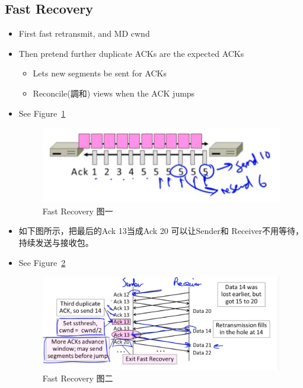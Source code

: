 \documentclass[12pt]{ctexart}   %
\begin{document}
	\subsection{Fast Recovery}
	\begin{itemize}
		\item First fast retransmit, and MD cwnd
		\item Then pretend further duplicate ACKs are the expected ACKs
		\begin{itemize}
			\item Lets new segments be sent for ACKs
			\item Reconcile(調和) views when the ACK jumps
		\end{itemize}
		\item See Figure~\ref{fig:7-7-4}
		  
		 \begin{figure}[h!] %
		\centering
		 \includegraphics[scale=0.7]{images/7-7-4}
		\caption{ Fast Recovery 图一 }
		 \label{fig:7-7-4}
		 \end{figure}
		 
		 \item 如下图所示，把最后的Ack 13当成Ack 20 可以让Sender和 Receiver不用等待，持续发送与接收包。
		 \item See Figure~\ref{fig:7-7-5}
		  
		 \begin{figure}[h!] %
		\centering
		 \includegraphics[scale=0.7]{images/7-7-5}
		\caption{ Fast Recovery 图二 }
		 \label{fig:7-7-5}
		 \end{figure}
		 

\end{itemize}
\end{document}
